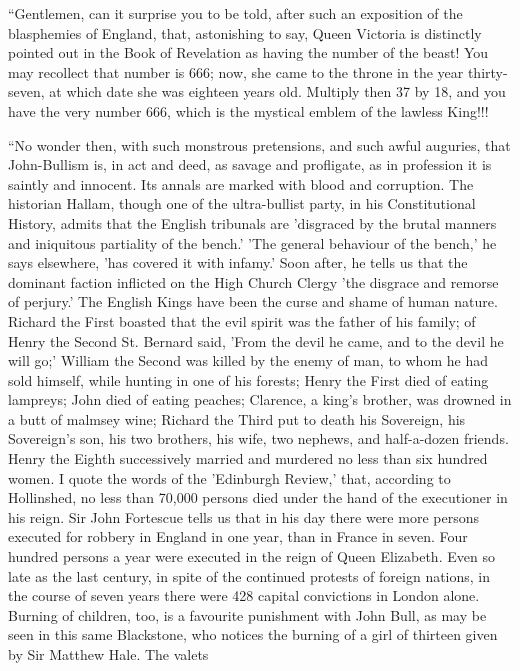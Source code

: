 ``Gentlemen, can it surprise you to be told, after
such an exposition of the blasphemies of England, that,
astonishing to say, Queen Victoria is distinctly pointed
out in the Book of Revelation as having the number of the
beast! You may recollect that number is 666; now, she
came to the throne in the year thirty-seven, at which
date she was eighteen years old. Multiply then 37 by 18,
and you have the very number 666, which is the mystical
emblem of the lawless King!!!

``No wonder then, with such monstrous pretensions,
and such awful auguries, that John-Bullism is, in act and
deed, as savage and profligate, as in profession it is
saintly and innocent. Its annals are marked with blood
and corruption. The historian Hallam, though one of the
ultra-bullist party, in his Constitutional History,
admits that the English tribunals are 'disgraced by the
brutal manners and iniquitous partiality of the bench.'
'The general behaviour of the bench,' he says elsewhere,
'has covered it with infamy.' Soon after, he tells us
that the dominant faction inflicted on the High Church
Clergy 'the disgrace and remorse of perjury.' The English
Kings have been the curse and shame of human nature.
Richard the First boasted that the evil spirit was the
father of his family; of Henry the Second St. Bernard
said, 'From the devil he came, and to the devil he will
go;' William the Second was killed by the enemy of man,
to whom he had sold himself, while hunting in one of his
forests; Henry the First died of eating lampreys; John
died of eating peaches; Clarence, a king's brother, was
drowned in a butt of malmsey wine; Richard the Third put
to death his Sovereign, his Sovereign's son, his two
brothers, his wife, two nephews, and half-a-dozen
friends. Henry the Eighth successively married and
murdered no less than six hundred women. I quote the
words of the 'Edinburgh Review,' that, according to
Hollinshed, no less than 70,000 persons died under the
hand of the executioner in his reign. Sir John Fortescue
tells us that in his day there were more persons executed
for robbery in England in one year, than in France in
seven. Four hundred persons a year were executed in the
reign of Queen Elizabeth. Even so late as the last
century, in spite of the continued protests of foreign
nations, in the course of seven years there were 428
capital convictions in London alone. Burning of children,
too, is a favourite punishment with John Bull, as may be
seen in this same Blackstone, who notices the burning of
a girl of thirteen given by Sir Matthew Hale. The valets
